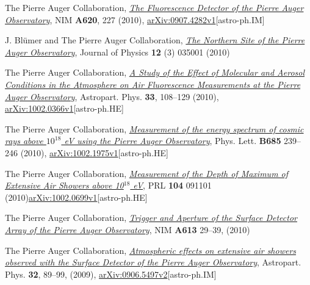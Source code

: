 \begin{etaremune}
\item {}The Pierre Auger Collaboration,
\href{http://dx.doi.org/10.1016/j.nima.2010.04.023}{\emph{The Fluorescence
Detector of the Pierre Auger Observatory}}, NIM {\bf A620}, 227 (2010),
\href{http://arxiv.org/abs/0907.4282}{arXiv:0907.4282v1}[astro-ph.IM]

\item {}J. Bl\"umer and The Pierre Auger Collaboration,
\href{http://dx.doi.org/10.1088/1367-2630/12/3/035001}{\emph{The Northern Site
of the Pierre Auger Observatory}}, Journal of Physics {\bf 12} (3) 035001
(2010)

\item {}The Pierre Auger Collaboration,
\href{http://dx.doi.org/10.1016/j.astropartphys.2009.12.005}{\emph{A Study of
the Effect of Molecular and Aerosol Conditions in the Atmosphere on Air
Fluorescence Measurements at the Pierre Auger Observatory}}, Astropart. Phys.
{\bf 33}, 108--129 (2010),
\href{http://arxiv.org/abs/0907.4282}{arXiv:1002.0366v1}[astro-ph.HE]

\item {}The Pierre Auger Collaboration,
\href{http://dx.doi.org/10.1016/j.physletb.2010.02.013}{\emph{Measurement of
the energy spectrum of cosmic rays above $10^{18}$ eV using the Pierre Auger
Observatory}}, Phys. Lett. {\bf B685} 239--246 (2010),
\href{http://arxiv.org/abs/1002.1975}{arXiv:1002.1975v1}[astro-ph.HE]

\item {}The Pierre Auger Collaboration,
\href{http://dx.doi.org/10.1103/PhysRevLett.104.091101}{\emph{Measurement of
the Depth of Maximum of Extensive Air Showers above 10$^{18}$ eV}}, PRL {\bf
104} 091101
(2010)\href{http://arxiv.org/abs/1002.0699}{arXiv:1002.0699v1}[astro-ph.HE]

\item {}The Pierre Auger Collaboration,
\href{http://dx.doi.org/10.1016/j.nima.2009.11.018}{\emph{Trigger and Aperture
of the Surface Detector Array of the Pierre Auger Observatory}}, NIM {\bf A613}
29--39, (2010)

\item {} The Pierre Auger Collaboration,
\href{http://dx.doi.org/10.1016/j.astropartphys.2009.06.004}{\emph{Atmospheric
effects on extensive air showers observed with the Surface Detector of the
Pierre Auger Observatory}}, Astropart. Phys. {\bf 32}, 89--99, (2009),
\href{http://arxiv.org/abs/0906.5497/}{arXiv:0906.5497v2}[astro-ph.IM]


\end{etaremune}
